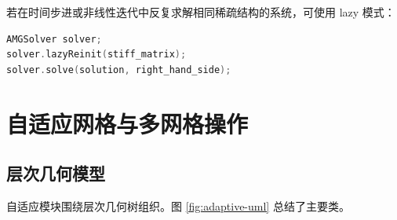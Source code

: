 \documentclass[UTF8,openany,zihao=-4,scheme=chinese]{ctexbook}
\begin{document}
若在时间步进或非线性迭代中反复求解相同稀疏结构的系统，可使用 lazy 模式：

\begin{lstlisting}[language=C++]
AMGSolver solver;
solver.lazyReinit(stiff_matrix);
solver.solve(solution, right_hand_side);
\end{lstlisting}

\chapter{自适应网格与多网格操作}

\section{层次几何模型}

自适应模块围绕层次几何树组织。图 \ref{fig:adaptive-uml} 总结了主要类。
\end{document}

